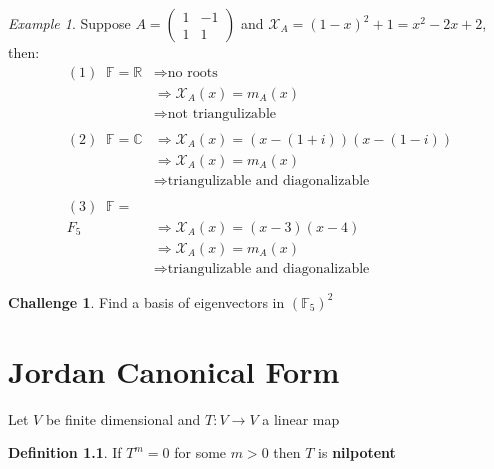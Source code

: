 \documentclass[11pt, a4paper]{report}
\numberwithin{equation}{section}
\renewcommand{\chi}{\mathcal{X}}
\newcommand{\R}{\mathbb{R}}
\newcommand{\C}{\mathbb{C}}
\newcommand{\F}{\mathbb{F}}
\newcommand{\smp}[1]{\left(\begin{smallmatrix}#1\end{smallmatrix}\right)}
\numberwithin{equation}{subsection}
\theoremstyle{plain}
\theoremstyle{definition}
\newtheorem{defn}{Definition}[chapter]
\newtheorem{ch}{Challenge}
\theoremstyle{remark}
\newtheorem{exmp}{Example}[chapter]
\begin{document}
\begin{exmp}
Suppose $A = \smp{1 & -1 \\ 1 & 1}$ and $\chi_A = (1-x)^2 + 1 = x^2 - 2x + 2$, then:
\begin{align*}
(1)\;\; \F = \R 	&\Longrightarrow \text{no roots}\\
		&\Longrightarrow \chi_A(x) = m_A(x)\\
		&\Longrightarrow \text{not triangulizable}\\\\
(2)\;\; \F = \C	&\Longrightarrow \chi_A(x) = (x - (1+i))(x - (1-i))\\
		&\Longrightarrow \chi_A(x) = m_A(x) \tag{distinct roots}\\
		&\Longrightarrow \text{triangulizable and diagonalizable} \\\\
(3)\;\; \F = \\F_5 &\Longrightarrow \chi_A(x) = (x-3)(x-4)\\
		&\Longrightarrow \chi_A(x) = m_A(x) \tag{distinct roots}\\
		&\Longrightarrow \text{triangulizable and diagonalizable}
\end{align*}

\end{exmp}

\begin{ch} Find a basis of eigenvectors in $(\F_5)^2$ \end{ch}

\chapter{Jordan Canonical Form}
Let $V$ be finite dimensional and $T: V \to V$ a linear map

\begin{defn} If $T^m = 0$ for some $m > 0$ then $T$ is \textbf{nilpotent} \end{defn}
\end{document}
